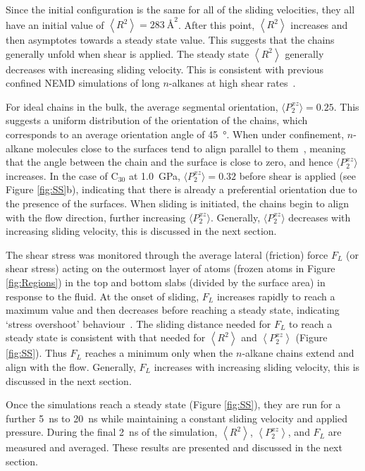 \documentclass[5p]{elsarticle}
\begin{document}
Since the initial configuration is the same for all of the sliding velocities, they all have an initial value of $\left< R^2 \right> = \SI{283}{\angstrom\squared}$. After this point, $\left< R^2 \right> $ increases and then asymptotes towards a steady state value. This suggests that the chains generally unfold when shear is applied. The steady state $\left< R^2 \right>$ generally decreases with increasing sliding velocity. This is consistent with previous confined NEMD simulations of long $n$-alkanes at high shear rates~\cite{Cho2017}.

For ideal chains in the bulk, the average segmental orientation, $\langle P_{2}^{xz}\rangle=0.25$. This suggests a uniform distribution of the orientation of the chains, which corresponds to an average orientation angle of \SI{45}{\degree}. When under confinement, $n$-alkane molecules close to the surfaces tend to align parallel to them~\cite{Cho2017}, meaning that the angle between the chain and the surface is close to zero, and hence $\langle P_{2}^{xz}\rangle$ increases. In the case of C$_{30}$ at \SI{1.0}{\giga\pascal}, $\langle P_{2}^{xz}\rangle=0.32$ before shear is applied (see Figure \ref{fig:SS}b), indicating that there is already a preferential orientation due to the presence of the surfaces. When sliding is initiated, the chains begin to align with the flow direction, further increasing $\langle P_{2}^{xz}\rangle$. Generally, $\langle P_{2}^{xz}\rangle$ decreases with increasing sliding velocity, this is discussed in the next section.

The shear stress was monitored through the average lateral (friction) force $F_L$ (or shear stress) acting on the outermost layer of atoms (frozen atoms in Figure \ref{fig:Regions}) in the top and bottom slabs (divided by the surface area) in response to the fluid. At the onset of sliding, $F_L$ increases rapidly to reach a maximum value and then decreases before reaching a steady state, indicating `stress overshoot' behaviour~\cite{Jeong2017}. The sliding distance needed for $F_L$ to reach a steady state is consistent with that needed for $\left< R^2 \right> $ and $\left<P_{2}^{xz} \right> $ (Figure \ref{fig:SS}). Thus $F_L$ reaches a minimum only when the $n$-alkane chains extend and align with the flow. Generally, $F_L$ increases with increasing sliding velocity, this is discussed in the next section.

Once the simulations reach a steady state (Figure \ref{fig:SS}), they are run for a further \SI{5}{\nano\second} to \SI{20}{\nano\second} while maintaining a constant sliding velocity and applied pressure. During the final \SI{2}{\nano\second} of the simulation, $\left< R^2 \right>$, $\left<P_{2}^{xz} \right> $, and $F_L$ are measured and averaged. These results are presented and discussed in the next section.
\end{document}
